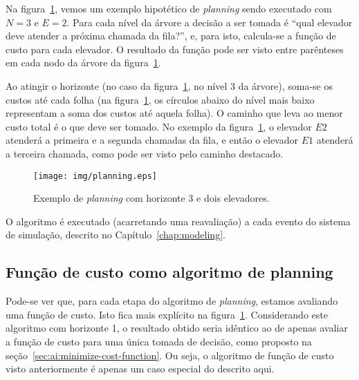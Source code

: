 Na figura~\ref{fig:planning}, vemos um exemplo hipotético de \textit{planning}
sendo executado com $N = 3$ e $E = 2$. Para cada nível da árvore a decisão a ser
tomada é ``qual elevador deve atender a próxima chamada da fila?'', e, para
isto, calcula-se a função de custo para cada elevador. O resultado da função
pode ser visto entre parênteses em cada nodo da árvore da
figura~\ref{fig:planning}.

Ao atingir o horizonte (no caso da figura~\ref{fig:planning}, no nível 3 da
árvore), soma-se os custos até cada folha (na figura~\ref{fig:planning}, os
círculos abaixo do nível mais baixo representam a soma dos custos até aquela
folha). O caminho que leva ao menor custo total é o que deve ser tomado. No
exemplo da figura~\ref{fig:planning}, o elevador $E2$ atenderá a primeira e a
segunda chamadas da fila, e então o elevador $E1$ atenderá a terceira chamada,
como pode ser visto pelo caminho destacado.

\begin{figure}[htb!]
  \centering
  \texttt{[image: img/planning.eps]}
  \caption{Exemplo de \textit{planning} com horizonte 3 e dois elevadores.}
\label{fig:planning}
\end{figure}

O algoritmo é executado (acarretando uma reavaliação) a cada evento do sistema
de simulação, descrito no Capítulo~\ref{chap:modeling}.

\subsection{Função de custo como algoritmo de planning}

Pode-se ver que, para cada etapa do algoritmo de \textit{planning}, estamos
avaliando uma função de custo. Isto fica mais explícito na
figura~\ref{fig:planning}. Considerando este algoritmo com horizonte 1, o
resultado obtido seria idêntico ao de apenas avaliar a função de custo
para uma única tomada de decisão, como proposto na
seção~\ref{sec:ai:minimize-cost-function}. Ou seja, o algoritmo de função de
custo visto anteriormente é apenas um caso especial do descrito aqui.
